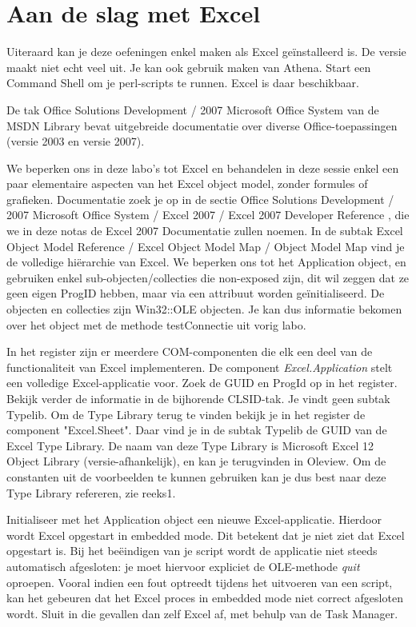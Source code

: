 \documentclass[11pt,a4paper]{report}
\begin{document}
\section{Aan de slag met Excel}
Uiteraard kan je deze oefeningen enkel maken als Excel geïnstalleerd is. De versie maakt niet echt veel uit. Je kan ook gebruik maken van Athena. Start een Command Shell om je perl-scripts te runnen. Excel is daar beschikbaar.
\par De tak Office Solutions Development / 2007 Microsoft Office System van de MSDN Library bevat uitgebreide documentatie over diverse Office-toepassingen (versie 2003 en versie 2007).
\par We beperken ons in deze labo's tot Excel en behandelen in deze sessie enkel een paar elementaire aspecten van het Excel object model, zonder formules of grafieken. Documentatie zoek je op in de sectie Office Solutions Development / 2007 Microsoft Office System / Excel 2007 / Excel 2007 Developer Reference , die we in deze notas de Excel 2007 Documentatie zullen noemen. In de subtak Excel Object Model Reference / Excel Object Model Map / Object Model Map vind je de volledige hiërarchie van Excel. We beperken ons tot het Application object, en gebruiken enkel sub-objecten/collecties die non-exposed zijn, dit wil zeggen dat ze geen eigen ProgID hebben, maar via een attribuut worden geïnitialiseerd. De objecten en collecties zijn Win32::OLE objecten. Je kan dus informatie bekomen over het object met de methode testConnectie uit vorig labo.
\par In het register zijn er meerdere COM-componenten die elk een deel van de functionaliteit van Excel implementeren. De component \textit{Excel.Application} stelt een volledige Excel-applicatie voor. Zoek de GUID en ProgId op in het register. Bekijk verder de informatie in de bijhorende CLSID-tak. Je vindt geen subtak Typelib. Om de Type Library terug te vinden bekijk je in het register de component "Excel.Sheet". Daar vind je in de subtak Typelib de GUID van de Excel Type Library. De naam van deze Type Library is Microsoft Excel 12 Object Library (versie-afhankelijk), en kan je terugvinden in Oleview. Om de constanten uit de voorbeelden te kunnen gebruiken kan je dus best naar deze Type Library refereren, zie reeks1.
\par Initialiseer met het Application object een nieuwe Excel-applicatie. Hierdoor wordt Excel opgestart in embedded mode. Dit betekent dat je niet ziet dat Excel opgestart is. Bij het beëindigen van je script wordt de applicatie niet steeds automatisch afgesloten: je moet hiervoor expliciet de OLE-methode \textit{quit} oproepen. Vooral indien een fout optreedt tijdens het uitvoeren van een script, kan het gebeuren dat het Excel proces in embedded mode niet correct afgesloten wordt. Sluit in die gevallen dan zelf Excel af, met behulp van de Task Manager.
\end{document}
